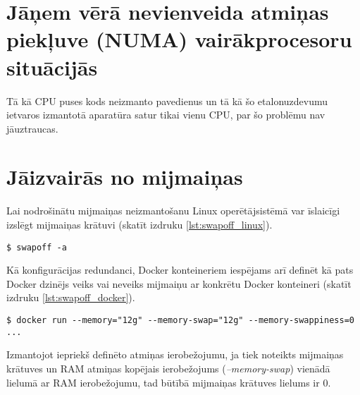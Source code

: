 \section{Jāņem vērā nevienveida atmiņas piekļuve (NUMA) vairākprocesoru situācijās}
Tā kā CPU puses kods neizmanto pavedienus un tā kā šo etalonuzdevumu ietvaros
izmantotā aparatūra satur tikai vienu CPU, par šo problēmu nav jāuztraucas.


\section{Jāizvairās no mijmaiņas}
Lai nodrošinātu mijmaiņas neizmantošanu Linux operētājsistēmā var īslaicīgi
izslēgt mijmaiņas krātuvi (skatīt izdruku \ref{lst:swapoff_linux}).
\begin{lstlisting}[caption={Mijmaiņas krātuves izlēgšana uz Linux},
  captionpos=b,
    label=lst:swapoff_linux]
$ swapoff -a
\end{lstlisting}

Kā konfigurācijas redundanci, Docker konteineriem iespējams arī definēt kā pats
Docker dzinējs veiks vai neveiks mijmaiņu ar konkrētu Docker konteineri (skatīt
izdruku \ref{lst:swapoff_docker}).

\begin{lstlisting}[caption={Mijmaiņas krātuves izlēgšana Docker konteinerim},
    label=lst:swapoff_docker,
  captionpos=b
    ]
$ docker run --memory="12g" --memory-swap="12g" --memory-swappiness=0 ...
\end{lstlisting}

Izmantojot iepriekš definēto atmiņas ierobežojumu, ja tiek noteikts mijmaiņas
krātuves un RAM atmiņas kopējais ierobežojums (\textit{--memory-swap}) vienādā
lielumā ar RAM ierobežojumu, tad būtībā mijmaiņas krātuves lielums ir 0.

